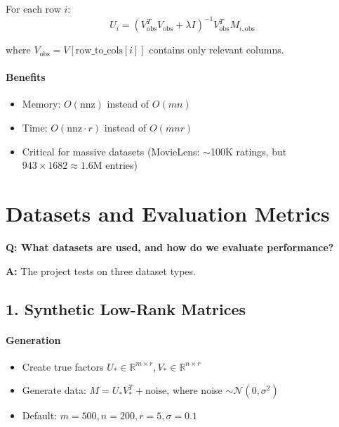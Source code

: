 \documentclass[11pt,oneside]{article}
\newcommand{\Real}{\mathbb{R}}
\newcommand{\question}[1]{\textbf{Q: #1}}
\newcommand{\answer}{\textbf{A: }}
\begin{document}
For each row $i$:
\begin{equation}
    U_i = (V_{\text{obs}}^T V_{\text{obs}} + \lambda I)^{-1} V_{\text{obs}}^T M_{i,\text{obs}}
\end{equation}

where $V_{\text{obs}} = V[\text{row\_to\_cols}[i]]$ contains only relevant columns.

\paragraph{Benefits}

\begin{itemize}
    \item Memory: $O(\text{nnz})$ instead of $O(mn)$
    \item Time: $O(\text{nnz} \cdot r)$ instead of $O(mnr)$
    \item Critical for massive datasets (MovieLens: $\sim$100K ratings, but $943 \times 1682 \approx 1.6\text{M}$ entries)
\end{itemize}

\section{Datasets and Evaluation Metrics}\label{sec:datasets}

\question{What datasets are used, and how do we evaluate performance?}

\answer The project tests on three dataset types.

\subsection*{1. Synthetic Low-Rank Matrices}

\paragraph{Generation}

\begin{itemize}
    \item Create true factors $U_* \in \Real^{m \times r}, V_* \in \Real^{n \times r}$
    \item Generate data: $M = U_* V_*^T + \text{noise}$, where noise $\sim \mathcal{N}(0, \sigma^2)$
    \item Default: $m=500, n=200, r=5, \sigma=0.1$
\end{itemize}
\end{document}
